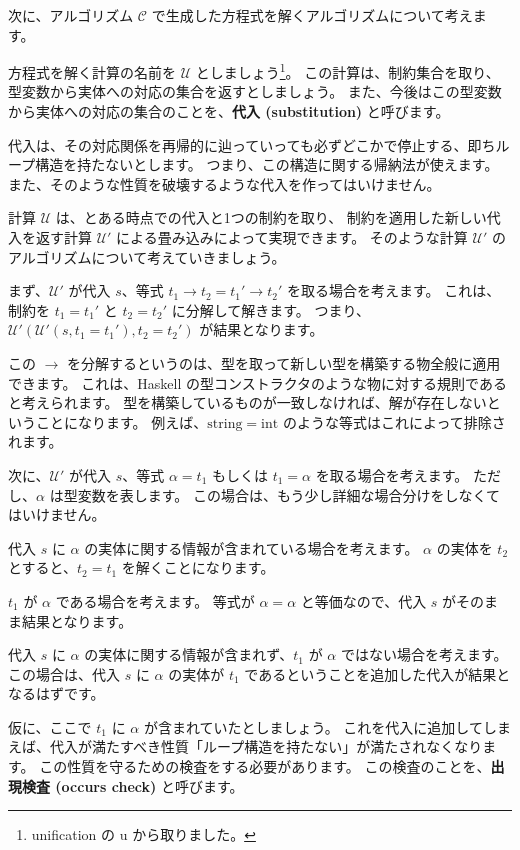 次に、アルゴリズム $\mathcal C$ で生成した方程式を解くアルゴリズムについて考えます。

方程式を解く計算の名前を $\mathcal U$ としましょう\footnote{unification の u から取りました。}。
この計算は、制約集合を取り、型変数から実体への対応の集合を返すとしましょう。
また、今後はこの型変数から実体への対応の集合のことを、\textbf{代入 (substitution)} と呼びます。

代入は、その対応関係を再帰的に辿っていっても必ずどこかで停止する、即ちループ構造を持たないとします。
つまり、この構造に関する帰納法が使えます。
また、そのような性質を破壊するような代入を作ってはいけません。

計算 $\mathcal U$ は、とある時点での代入と1つの制約を取り、
制約を適用した新しい代入を返す計算 $\mathcal{U'}$ による畳み込みによって実現できます。
そのような計算 $\mathcal{U'}$ のアルゴリズムについて考えていきましょう。

まず、$\mathcal{U'}$ が代入 $s$、等式 $t_1 \to t_2 = t_1' \to t_2'$ を取る場合を考えます。
これは、制約を $t_1 = t_1'$ と $t_2 = t_2'$ に分解して解きます。
つまり、$\mathcal{U'}(\mathcal{U'}(s, t_1 = t_1'), t_2 = t_2')$ が結果となります。

この $\to$ を分解するというのは、型を取って新しい型を構築する物全般に適用できます。
これは、Haskell の型コンストラクタのような物に対する規則であると考えられます。
型を構築しているものが一致しなければ、解が存在しないということになります。
例えば、$\mathrm{string} = \mathrm{int}$ のような等式はこれによって排除されます。

次に、$\mathcal{U'}$ が代入 $s$、等式 $\alpha = t_1$ もしくは $t_1 = \alpha$ を取る場合を考えます。
ただし、$\alpha$ は型変数を表します。
この場合は、もう少し詳細な場合分けをしなくてはいけません。

代入 $s$ に $\alpha$ の実体に関する情報が含まれている場合を考えます。
$\alpha$ の実体を $t_2$ とすると、$t_2 = t_1$ を解くことになります。

$t_1$ が $\alpha$ である場合を考えます。
等式が $\alpha = \alpha$ と等価なので、代入 $s$ がそのまま結果となります。

代入 $s$ に $\alpha$ の実体に関する情報が含まれず、$t_1$ が $\alpha$ ではない場合を考えます。
この場合は、代入 $s$ に $\alpha$ の実体が $t_1$ であるということを追加した代入が結果となるはずです。

仮に、ここで $t_1$ に $\alpha$ が含まれていたとしましょう。
これを代入に追加してしまえば、代入が満たすべき性質「ループ構造を持たない」が満たされなくなります。
この性質を守るための検査をする必要があります。
この検査のことを、\textbf{出現検査 (occurs check)} と呼びます。

